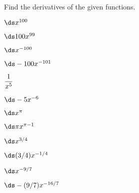 \begin{exercises}

Find the derivatives of the given functions.

\twocol

\begin{exercise} $\ds x^{100}$
\begin{answer} $\ds 100x^{99}$
\end{answer}\end{exercise}

\begin{exercise} $\ds x^{-100}$
\begin{answer} $\ds -100x^{-101}$
\end{answer}\end{exercise}

\begin{exercise} $\displaystyle {1\over x^5}$
\begin{answer} $\ds -5x^{-6}$
\end{answer}\end{exercise}

\begin{exercise} $\ds x^\pi$
\begin{answer} $\ds \pi x^{\pi-1}$
\end{answer}\end{exercise}

\begin{exercise} $\ds x^{3/4}$
\begin{answer} $\ds (3/4)x^{-1/4}$
\end{answer}\end{exercise}

\begin{exercise} $\ds x^{-9/7}$
\begin{answer} $\ds -(9/7)x^{-16/7}$
\end{answer}\end{exercise}

\endtwocol

\end{exercises}
